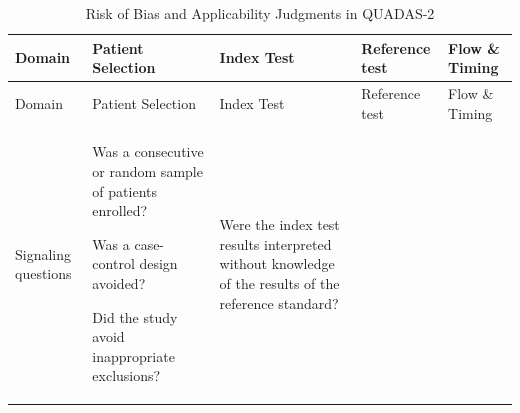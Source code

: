 \documentclass[
  11pt,
  a4paper,
  DIV=11,
  numbers=noendperiod]{scrreprt}
\begin{document}
\begin{longtable}[]{@{}
  >{\raggedright\arraybackslash}p{}
  >{\raggedright\arraybackslash}p{}
  >{\raggedright\arraybackslash}p{}
  >{\raggedright\arraybackslash}p{}
  >{\raggedright\arraybackslash}p{}@{}}
\caption{Risk of Bias and Applicability Judgments in
QUADAS-2}\label{tbl-quad}\tabularnewline
\toprule\noalign{}
\begin{minipage}[b]{\linewidth}\raggedright
Domain
\end{minipage} & \begin{minipage}[b]{\linewidth}\raggedright
Patient Selection
\end{minipage} & \begin{minipage}[b]{\linewidth}\raggedright
Index Test
\end{minipage} & \begin{minipage}[b]{\linewidth}\raggedright
Reference test
\end{minipage} & \begin{minipage}[b]{\linewidth}\raggedright
Flow \& Timing
\end{minipage} \\
\midrule\noalign{}
\endfirsthead
\toprule\noalign{}
\begin{minipage}[b]{\linewidth}\raggedright
Domain
\end{minipage} & \begin{minipage}[b]{\linewidth}\raggedright
Patient Selection
\end{minipage} & \begin{minipage}[b]{\linewidth}\raggedright
Index Test
\end{minipage} & \begin{minipage}[b]{\linewidth}\raggedright
Reference test
\end{minipage} & \begin{minipage}[b]{\linewidth}\raggedright
Flow \& Timing
\end{minipage} \\
\midrule\noalign{}
\endhead
\bottomrule\noalign{}
\endlastfoot
Signaling questions & Was a consecutive or random sample of patients
enrolled?

Was a case-control design avoided?

Did the study avoid inappropriate exclusions? & Were the index test
results interpreted without knowledge of the results of the reference
standard?


\end{longtable}
\end{document}
